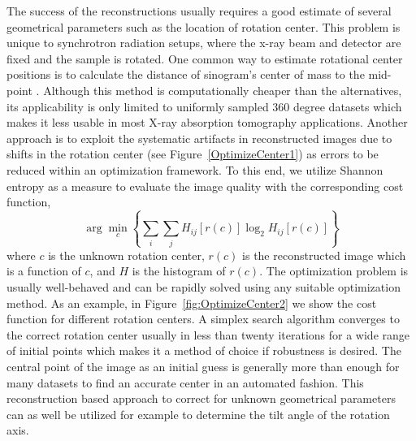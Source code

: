 \documentclass[pdf]{iucr}              %
\begin{document}
The success of the reconstructions usually requires a good estimate of several geometrical parameters such as the location of rotation center. This problem is unique to synchrotron radiation setups, where the x-ray beam and detector are fixed and the sample is rotated. One common way to estimate rotational center positions is to calculate the distance of sinogram's center of mass to the mid-point \cite{Azevedo}. Although this method is computationally cheaper than the alternatives, its applicability is only limited to uniformly sampled 360 degree datasets which makes it less usable in most X-ray absorption tomography applications. Another approach is to exploit the systematic artifacts in reconstructed images due to shifts in the rotation center \cite{donath_spie_2006} (see Figure~\ref{OptimizeCenter1}) as errors to be reduced within an optimization framework. To this end, we utilize Shannon entropy as a measure to evaluate the image quality with the corresponding cost function,
\begin{equation}
\arg \min_c \left\{\sum_i \sum_jH_{ij}\left[r(c)\right]\log_2 H_{ij}\left[r(c)\right]\right\}
\end{equation}
where $c$ is the unknown rotation center, $r(c)$ is the reconstructed image which is a function of $c$, and $H$ is the histogram of $r(c)$. The optimization problem is usually well-behaved and can be rapidly solved using any suitable optimization method.  As an example, in Figure~\ref{fig:OptimizeCenter2} we show the cost function for different rotation centers. A simplex search algorithm converges to the correct rotation center usually in less than twenty iterations for a wide range of initial points which makes it a method of choice if robustness is desired. The central point of the image as an initial guess is generally more than enough for many datasets to find an accurate center in an automated fashion. This reconstruction based approach to correct for unknown geometrical parameters can as well be utilized for example to determine the tilt angle of the rotation axis.
\end{document}
